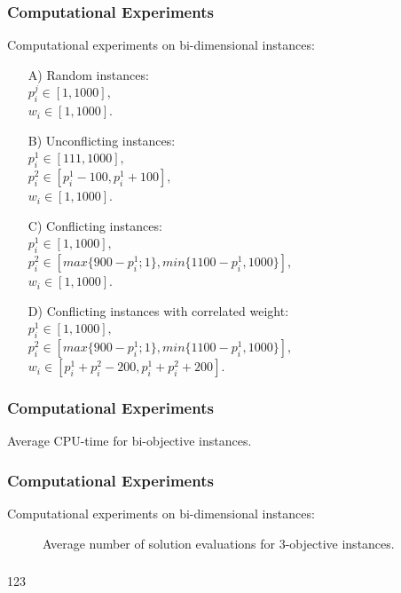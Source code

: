 %
\begin{frame}
\frametitle{Computational Experiments}
Computational experiments on bi-dimensional instances:
\begin{enumerate}
  \item[A)]{ Random instances:\\
    $p^j_i \in [1, 1000]$,\\
    $w_i \in [1,1000]$.} \medskip
  \item[B)]{ Unconflicting instances: \\
    $p^1_i \in [111, 1000],$ \\
    $p^2_i \in [p^1_i - 100, p^1_i + 100],$ \\
    $w_i \in [1,1000]$.} \medskip
  \item[C)]{ Conflicting instances: \\
    $p^1_i \in [1, 1000],$ \\
    $p^2_i \in [max\{900-p^1_i;1\}, min\{1100-p^1_i, 1000\}],$ \\
    $w_i \in [1,1000]$.} \medskip
  \item[D)]{ Conflicting instances with correlated weight: \\
    $p^1_i \in [1, 1000],$ \\
    $p^2_i \in [max\{900-p^1_i;1\}, min\{1100-p^1_i, 1000\}],$ \\
    $w_i \in [p^1_i+p^2_i-200, p^1_i+p^2_i+200]$.}
\end{enumerate}
\end{frame}

%
\begin{frame}
\frametitle{Computational Experiments}
\begin{table}[]
  \renewcommand*{\arraystretch}{0.9}
  \centering
  
  \caption{Average CPU-time for bi-objective instances.}
\end{table}
\end{frame}


%
\begin{frame}
\frametitle{Computational Experiments}
Computational experiments on bi-dimensional instances:
\begin{figure}
  
  \caption{Average number of solution evaluations for 3-objective instances.}
\end{figure}
\end{frame}


%
\begin{frame}
\frametitle{}
123
\end{frame}
